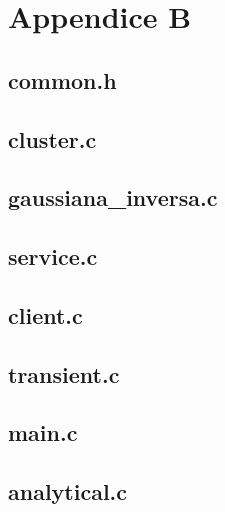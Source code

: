 \chapter{Appendice B}\label{appendiceB}
\lstset{frame=}
\section{common.h}

\pagebreak
\section{cluster.c}

\pagebreak
\section{gaussiana\_inversa.c}

\pagebreak
\section{service.c}

\pagebreak
\section{client.c}

\pagebreak
\section{transient.c}

\pagebreak
\section{main.c}

\pagebreak
\section{analytical.c}
